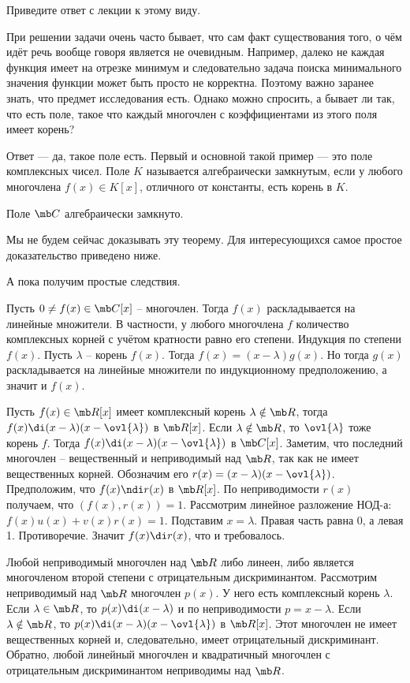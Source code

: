 \upr Приведите  ответ с лекции к этому виду.
\eupr

При решении задачи очень часто бывает, что сам факт существования того, о чём идёт речь вообще говоря является не очевидным. Например, далеко не каждая функция имеет на отрезке минимум и следовательно задача поиска минимального значения функции может быть просто не корректна. Поэтому важно заранее знать, что предмет исследования есть.  Однако можно спросить, а бывает ли так, что есть поле, такое что каждый многочлен с коэффициентами из этого поля имеет корень?

Ответ — да, такое поле есть. Первый и основной такой пример --- это поле комплексных чисел.
 Поле $K$ называется алгебраически замкнутым, если у любого многочлена  $f(x)\in K[x]$, отличного от константы, есть корень в $K$.
\edfn

 Поле $\mb C$ алгебраически замкнуто.
\ethrm

Мы не будем сейчас доказывать эту теорему. Для интересующихся самое простое доказательство приведено ниже. 

А пока получим простые следствия.

\crl Пусть $0\neq f(x) \in \mb C[x]$ -- многочлен. Тогда $f(x)$ раскладывается на линейные множители. В частности,  у любого многочлена $f$ количество комплексных корней с учётом кратности равно его степени.
\ecrl
\proof Индукция по степени $f(x)$. Пусть $\lambda$ -- корень $f(x)$. Тогда $f(x)=(x-\lambda)g(x)$. Но тогда $g(x)$ раскладывается на линейные множители по индукционному предположению, а значит и $f(x)$.
\endproof

\lm Пусть $f(x)\in \mb R[x]$ имеет комплексный корень $\lambda \notin \mb R$, тогда $f(x)\di(x-\lambda)(x-\ovl{\lambda})$ в $\mb R[x]$.
\proof Если $\lambda \notin \mb R$, то $\ovl{\lambda}$ тоже корень $f$. Тогда $f(x)\di(x-\lambda)(x-\ovl{\lambda})$ в $\mb C[x]$. Заметим, что последний многочлен -- вещественный и неприводимый над $\mb R$, так как не имеет вещественных корней. Обозначим его $r(x)=(x-\lambda)(x-\ovl{\lambda})$. Предположим, что $f(x)\ndi r(x)$ в $\mb R[x]$. По неприводимости $r(x)$ получаем, что $(f(x),r(x))=1$. Рассмотрим линейное разложение НОД-а: $f(x)u(x)+v(x)r(x)=1$. Подставим $x=\lambda$. Правая часть равна 0, а левая 1. Противоречие. Значит $f(x)\di r(x)$, что и требовалось. 
\endproof
\elm

\crl Любой неприводимый многочлен над $\mb R$ либо линеен, либо является многочленом второй степени с отрицательным дискриминантом.
\proof Рассмотрим неприводимый над $\mb R$ многочлен $p(x)$. У него есть комплексный корень $\lambda$. Если $\lambda \in \mb R$, то $p(x)\di (x-\lambda)$ и по неприводимости $p=x-\lambda$.  Если $\lambda \notin \mb R$, то $p(x)\di (x-\lambda)(x-\ovl{\lambda})$ в $\mb R[x]$. Этот многочлен не имеет вещественных корней и, следовательно, имеет отрицательный дискриминант. Обратно, любой линейный многочлен и квадратичный многочлен с отрицательным дискриминантом неприводимы над $\mb R$.
\endproof
\ecrl







